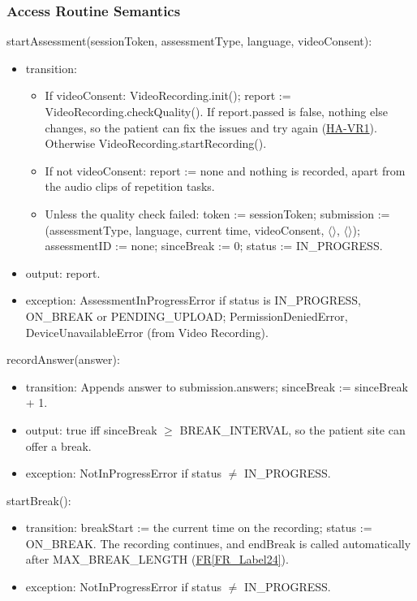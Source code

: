 \documentclass[12pt, titlepage]{article}
\newcommand{\srsref}[2]{\href{https://github.com/Nour-Fawaz/MacaBoca/blob/main/pdfs/SRS/SRS.pdf}{#1\ref*{#2}}}
\newcommand{\hazref}[1]{\href{https://github.com/Nour-Fawaz/MacaBoca/blob/main/pdfs/HazardAnalysis/HazardAnalysis.pdf}{#1}}
\begin{document}
\subsubsection{Access Routine Semantics}

\noindent startAssessment(sessionToken, assessmentType, language, videoConsent):
\begin{itemize}
\item transition:
  \begin{itemize}
  \item If videoConsent: VideoRecording.init(); report := VideoRecording.checkQuality(). If report.passed is false, nothing else changes, so the patient can fix the issues and try again (\hazref{HA-VR1}). Otherwise VideoRecording.startRecording().
  \item If not videoConsent: report := none and nothing is recorded, apart from the audio clips of repetition tasks.
  \item Unless the quality check failed: token := sessionToken; submission := (assessmentType, language, current time, videoConsent, $\langle\rangle$, $\langle\rangle$); assessmentID := none; sinceBreak := 0; status := IN\_PROGRESS.
  \end{itemize}
\item output: report.
\item exception: AssessmentInProgressError if status is IN\_PROGRESS, ON\_BREAK or PENDING\_UPLOAD; PermissionDeniedError, DeviceUnavailableError (from Video Recording).
\end{itemize}

\noindent recordAnswer(answer):
\begin{itemize}
\item transition: Appends answer to submission.answers; sinceBreak := sinceBreak + 1.
\item output: true iff sinceBreak $\geq$ BREAK\_INTERVAL, so the patient site can offer a break.
\item exception: NotInProgressError if status $\neq$ IN\_PROGRESS.
\end{itemize}

\noindent startBreak():
\begin{itemize}
\item transition: breakStart := the current time on the recording; status := ON\_BREAK. The recording continues, and endBreak is called automatically after MAX\_BREAK\_LENGTH (\srsref{FR}{FR_Label24}).
\item exception: NotInProgressError if status $\neq$ IN\_PROGRESS.
\end{itemize}
\end{document}
